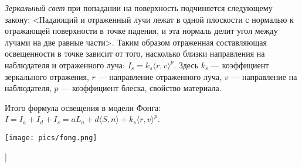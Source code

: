 \textit{Зеркальный свет} при попадании на поверхность подчиняется следующему закону: <Падающий и отраженный лучи лежат в одной плоскости с нормалью к отражающей поверхности в точке падения, и эта нормаль делит угол между лучами на две равные части>. 
Таким образом отраженная составляющая освещенности в точке зависит от того, насколько близки направления на наблюдателя и отраженного луча: $I_s = k_s \langle r, v \rangle^p$. Здесь $k_s$ --- коэффициент зеркального отражения, $r$ --- направление отраженного луча, $v$ --- направление на наблюдателя, $p$ --- коэффициент блеска, свойство материала.

Итого формула освещения в модели Фонга: $I = I_a + I_d + I_s = a L_a + d \langle S, n \rangle + k_s \langle r, v \rangle^p$.

\texttt{[image: pics/fong.png]}

\bigbreak
[\cite[page 19-26]{iit_graphics}]